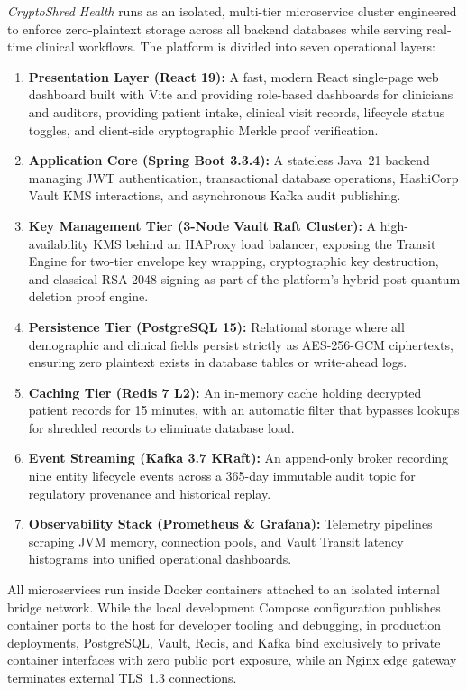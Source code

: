 \textit{CryptoShred Health} runs as an isolated, multi-tier microservice cluster engineered to enforce zero-plaintext storage across all backend databases while serving real-time clinical workflows. The platform is divided into seven operational layers:
\begin{enumerate}
    \item \textbf{Presentation Layer (React 19):} A fast, modern React single-page web dashboard built with Vite and providing role-based dashboards for clinicians and auditors, providing patient intake, clinical visit records, lifecycle status toggles, and client-side cryptographic Merkle proof verification.
    \item \textbf{Application Core (Spring Boot 3.3.4):} A stateless Java~21 backend managing JWT authentication, transactional database operations, HashiCorp Vault KMS interactions, and asynchronous Kafka audit publishing.
    \item \textbf{Key Management Tier (3-Node Vault Raft Cluster):} A high-availability KMS behind an HAProxy load balancer, exposing the Transit Engine for two-tier envelope key wrapping, cryptographic key destruction, and classical RSA-2048 signing as part of the platform's hybrid post-quantum deletion proof engine.
    \item \textbf{Persistence Tier (PostgreSQL 15):} Relational storage where all demographic and clinical fields persist strictly as AES-256-GCM ciphertexts, ensuring zero plaintext exists in database tables or write-ahead logs.
    \item \textbf{Caching Tier (Redis 7 L2):} An in-memory cache holding decrypted patient records for 15 minutes, with an automatic filter that bypasses lookups for shredded records to eliminate database load.
    \item \textbf{Event Streaming (Kafka 3.7 KRaft):} An append-only broker recording nine entity lifecycle events across a 365-day immutable audit topic for regulatory provenance and historical replay.
    \item \textbf{Observability Stack (Prometheus \& Grafana):} Telemetry pipelines scraping JVM memory, connection pools, and Vault Transit latency histograms into unified operational dashboards.
\end{enumerate}

All microservices run inside Docker containers attached to an isolated internal bridge network. While the local development Compose configuration publishes container ports to the host for developer tooling and debugging, in production deployments, PostgreSQL, Vault, Redis, and Kafka bind exclusively to private container interfaces with zero public port exposure, while an Nginx edge gateway terminates external TLS~1.3 connections. 

